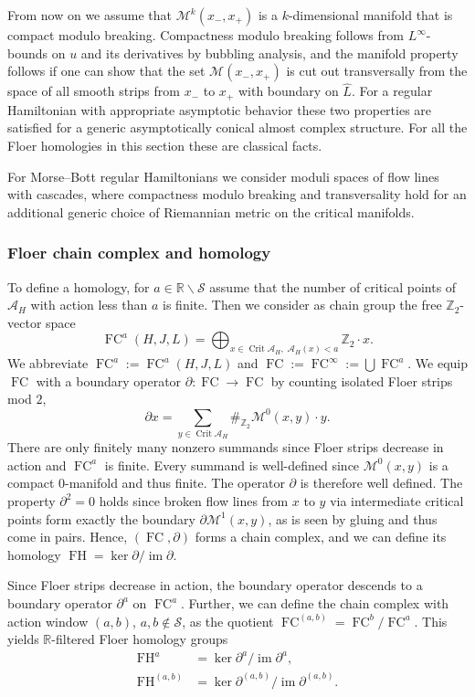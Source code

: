 \documentclass{amsart}
\newcommand{\Acal}{{\mathcal{A}}}
\newcommand{\Mcal}{{\mathcal{M}}}
\newcommand{\Scal}{{\mathcal{S}}}
\newcommand{\RR}{\mathbb{R}}
\newcommand{\ZZ}{\mathbb{Z}}
\newcommand{\im}{\operatorname{im}}
\newcommand{\FH}{\operatorname{FH}}
\newcommand{\FC}{\operatorname{FC}}
\newcommand{\Crit}{\operatorname{Crit}}
\newcommand{\haat}{\widehat}
\theoremstyle{definition}
\theoremstyle{remark}
\numberwithin{equation}{section}
\begin{document}
From now on we assume that $\Mcal^k(x_-,x_+)$ is a $k$-dimensional manifold that is compact modulo breaking. Compactness modulo breaking follows from $L^{\infty}$- bounds on $u$ and its derivatives by bubbling analysis, and the manifold property follows if one can show that the set $\Mcal(x_-,x_+)$ is cut out transversally from the space of all smooth strips from $x_-$ to $x_+$ with boundary on $\haat L$. For a regular Hamiltonian with appropriate asymptotic behavior these two properties are satisfied for a generic asymptotically conical almost complex structure. For all the Floer homologies in this section these are classical facts.

For Morse--Bott regular Hamiltonians we consider moduli spaces of flow lines with cascades, where compactness modulo breaking and transversality hold for an additional generic choice of Riemannian metric on the critical manifolds. 

\subsubsection*{Floer chain complex and homology}

To define a homology, for $a\in\RR\backslash\Scal$ assume that the number of critical points of $\Acal_H$ with action less than $a$ is finite. Then we consider as chain group the free $\ZZ_2$-vector space
\begin{equation*}
	\FC^a(H,J,L)=\bigoplus_{x\in\Crit\Acal_H,\; \Acal_H(x)<a}\ZZ_2\cdot x.
\end{equation*}
We abbreviate $\FC^a:=\FC^a(H,J,L)$ and $\FC:=\FC^\infty:=\bigcup \FC^a$. We equip $\FC$ with a boundary operator $\partial:\FC\to \FC$ by counting isolated Floer strips mod $2$,
\begin{equation*}
	\partial x=\sum_{y\in\Crit\Acal_H}\#_{\ZZ_2}\Mcal^0(x,y)\cdot y.
\end{equation*}
There are only finitely many nonzero summands since Floer strips decrease in action and $\FC^a$ is finite. Every summand is well-defined since $\Mcal^0(x,y)$ is a compact 0-manifold and thus finite. The operator $\partial$ is therefore well defined. The property $\partial^2=0$ holds since broken flow lines from $x$ to $y$ via intermediate critical points form exactly the boundary $\partial\Mcal^1(x,y)$, as is seen by gluing and thus come in pairs. Hence, $(\FC,\partial)$ forms a chain complex, and we can define its homology $\FH=\ker\partial/\im\partial$.

Since Floer strips decrease in action, the boundary operator descends to a boundary operator $\partial^a$ on $\FC^a$. Further, we can define the chain complex with action window $(a,b)$, $a,b\notin\Scal$, as the quotient	$\FC^{(a,b)}=\FC^b/\FC^a$. This yields $\RR$-filtered Floer homology groups
\begin{align*}
	\FH^{a}&=\ker\partial^{a}/\im\partial^{a},\\
	\FH^{(a,b)}&=\ker\partial^{(a,b)}/\im\partial^{(a,b)}.
\end{align*}
\end{document}
